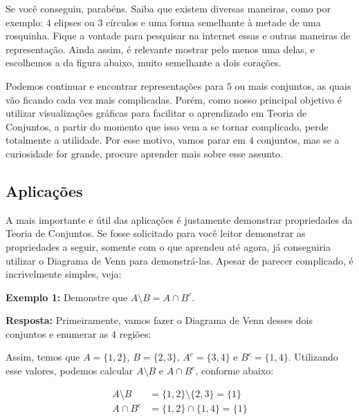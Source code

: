   Se você conseguiu, parabéns. Saiba que existem diversas maneiras, como por exemplo: $4$ elipses ou $3$ círculos e uma forma semelhante à metade de uma rosquinha. Fique a vontade para pesquisar na internet essas e outras maneiras de representação. Ainda assim, é relevante mostrar pelo menos uma delas, e escolhemos a da figura abaixo, muito semelhante a dois corações.


  Podemos continuar e encontrar representações para $5$ ou mais conjuntos, as quais vão ficando cada vez mais complicadas. Porém, como nosso principal objetivo é utilizar visualizações gráficas para facilitar o aprendizado em Teoria de Conjuntos, a partir do momento que isso vem a se tornar complicado, perde totalmente a utilidade. Por esse motivo, vamos parar em $4$ conjuntos, mas se a curiosidade for grande, procure aprender mais sobre esse assunto.

  \subsection{Aplicações}
  A mais importante e útil das aplicações é justamente demonstrar propriedades da Teoria de Conjuntos. Se fosse solicitado para você leitor demonstrar as propriedades a seguir, somente com o que aprendeu até agora, já conseguiria utilizar o Diagrama de Venn para demonstrá-las. Apesar de parecer complicado, é incrivelmente simples, veja:
  
  \textbf{Exemplo 1:} Demonstre que $A \setminus B = A \cap B^c$.

  \textbf{Resposta:} Primeiramente, vamos fazer o Diagrama de Venn desses dois conjuntos e enumerar as $4$ regiões:


  Assim, temos que $A=\{1,2\}$, $B=\{2,3\}$, $A^c=\{3,4\}$ e $B^c=\{1,4\}$. Utilizando esse valores, podemos calcular $A \setminus B$ e $A \cap B^c$, conforme abaixo:

  \begin{equation*}
    \begin{aligned}
      A \setminus B &= \{1,2\} \setminus \{2,3\} = \{1\}\\
      A \cap B^c &= \{1,2\} \cap \{1,4\} = \{1\}
    \end{aligned}
  \end{equation*}

